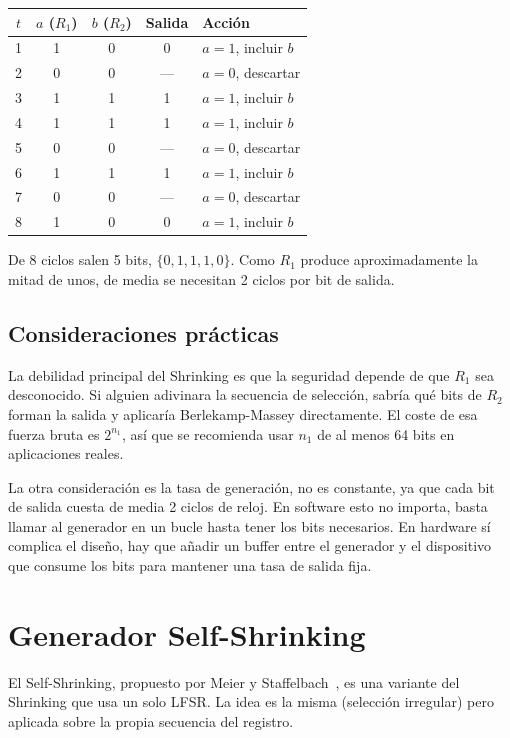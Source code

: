 \begin{center}
\begin{tabular}{c|cc|c|l}
\hline
$t$ & $a$ ($R_1$) & $b$ ($R_2$) & Salida & Acción \\
\hline
1 & 1 & 0 & 0 & $a=1$, incluir $b$ \\
2 & 0 & 0 & --- & $a=0$, descartar \\
3 & 1 & 1 & 1 & $a=1$, incluir $b$ \\
4 & 1 & 1 & 1 & $a=1$, incluir $b$ \\
5 & 0 & 0 & --- & $a=0$, descartar \\
6 & 1 & 1 & 1 & $a=1$, incluir $b$ \\
7 & 0 & 0 & --- & $a=0$, descartar \\
8 & 1 & 0 & 0 & $a=1$, incluir $b$ \\
\hline
\end{tabular}
\end{center}

De 8 ciclos salen 5 bits, $\{0, 1, 1, 1, 0\}$.
Como $R_1$ produce aproximadamente la mitad de unos, de media se necesitan 2 ciclos por bit de salida.

\subsection{Consideraciones prácticas}

La debilidad principal del Shrinking es que la seguridad depende de que $R_1$ sea desconocido.
Si alguien adivinara la secuencia de selección, sabría qué bits de $R_2$ forman la salida y aplicaría Berlekamp-Massey directamente.
El coste de esa fuerza bruta es $2^{n_1}$, así que se recomienda usar $n_1$ de al menos 64 bits en aplicaciones reales.

La otra consideración es la tasa de generación, no es constante, ya que cada bit de salida cuesta de media 2 ciclos de reloj.
En software esto no importa, basta llamar al generador en un bucle hasta tener los bits necesarios.
En hardware sí complica el diseño, hay que añadir un buffer entre el generador y el dispositivo que consume los bits para mantener una tasa de salida fija.

\section{Generador Self-Shrinking}
\label{sec:self-shrinking}

El Self-Shrinking, propuesto por Meier y Staffelbach~\cite{meier1994}, es una variante del Shrinking que usa un solo LFSR.
La idea es la misma (selección irregular) pero aplicada sobre la propia secuencia del registro.


